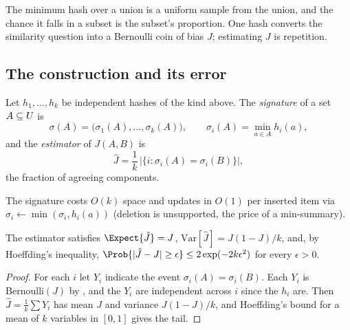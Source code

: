 The minimum hash over a union is a uniform sample from the union, and the chance
it falls in a subset is the subset's proportion. One hash converts the
similarity question into a Bernoulli coin of bias $J$; estimating $J$ is
repetition.

\subsection*{The construction and its error}

\begin{definition}
\label{def:minhash}
Let $h_1, \ldots, h_k$ be independent hashes of the kind above. The
\emph{signature} of a set $A \subseteq U$ is
\[
  \sigma(A) = \bigl(\sigma_1(A), \ldots, \sigma_k(A)\bigr),
  \qquad
  \sigma_i(A) = \min_{a \in A} h_i(a),
\]
and the \emph{estimator} of $J(A, B)$ is
\[
  \hat J = \frac{1}{k}\,\bigl|\{i : \sigma_i(A) = \sigma_i(B)\}\bigr|,
\]
the fraction of agreeing components.
\end{definition}

\begin{algorithm}[ht]
  \caption{MinHash signature and Jaccard estimate}
  \label{alg:minhash-signature-estimate}
  \BlankLine
\end{algorithm}

The signature costs $O(k)$ space and updates in $O(1)$ per inserted item via
$\sigma_i \gets \min(\sigma_i, h_i(a))$ (deletion is unsupported, the price of a
min-summary).

\begin{proposition}
\label{prop:minhash-error}
The estimator satisfies $\Expect{\hat J} = J$, $\mathrm{Var}[\hat J] = J(1 -
J)/k$, and, by Hoeffding's inequality, $\Prob{|\hat J - J| \ge \epsilon} \le 2
\exp(-2 k \epsilon^2)$ for every $\epsilon > 0$.
\end{proposition}

\begin{proof}
For each $i$ let $Y_i$ indicate the event $\sigma_i(A) = \sigma_i(B)$. Each
$Y_i$ is $\mathrm{Bernoulli}(J)$ by , and the $Y_i$
are independent across $i$ since the $h_i$ are. Then $\hat J = \frac1k \sum Y_i$ has mean $J$ and
variance $J(1-J)/k$, and Hoeffding's bound for a mean of $k$ variables in
$[0,1]$ gives the tail.
\end{proof}

